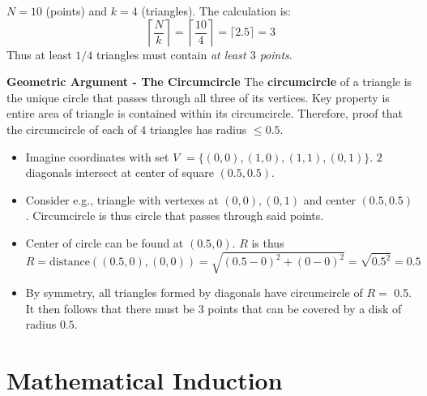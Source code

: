 \documentclass[../Main.tex]{subfiles}
\begin{document}
{\begin{itemize}
     $N=10$ (points) and $k=4$ (triangles). The calculation is:
\[
\left\lceil \frac{N}{k} \right\rceil = \left\lceil \frac{10}{4} \right\rceil = \lceil 2.5 \rceil = 3
\]
Thus at least $1/4$ triangles must contain \textit{at least $3$ points}.
\end{itemize}

\textbf{Geometric Argument - The Circumcircle}
The \textbf{circumcircle} of a triangle is the unique circle that passes through all three of its vertices. Key property is entire area of triangle is contained within its circumcircle. Therefore, proof that the circumcircle of each of $4$ triangles has radius $\leq 0.5$.
\begin{itemize}
    \item Imagine coordinates with set $V$ $=\{(0,0), (1,0), (1,1), (0,1)\}$. $2$ diagonals intersect at center of square $(0.5, 0.5)$.
    \item Consider e.g., triangle with vertexes at $(0,0), (0,1)$ and center $(0.5, 0.5)$. Circumcircle is thus circle that passes through said points.
    \item Center of circle can be found at $(0.5, 0)$. $R$ is thus 
    \[
        R = \text{distance}((0.5,0), (0,0)) = \sqrt{(0.5-0)^2 + (0-0)^2} = \sqrt{0.5^2} = 0.5
    \]
    \item By symmetry, all triangles formed by diagonals have circumcircle of $R=$ 0.5. It then follows that there must be $3$ points that can be covered by a disk of radius $0.5$.
\end{itemize}
}


\section{Mathematical Induction}
\end{document}
